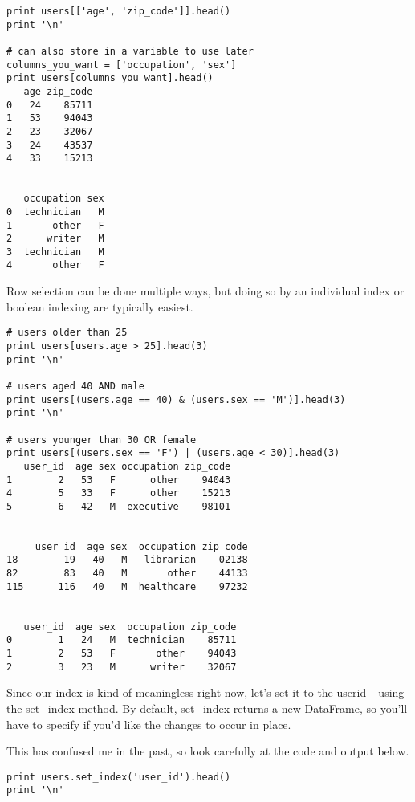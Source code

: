\begin{framed}
\begin{framed}
\begin{framed}
\begin{framed}
\begin{framed}
\begin{framed}
\begin{verbatim}
print users[['age', 'zip_code']].head()
print '\n'

# can also store in a variable to use later
columns_you_want = ['occupation', 'sex'] 
print users[columns_you_want].head()
   age zip_code
0   24    85711
1   53    94043
2   23    32067
3   24    43537
4   33    15213


   occupation sex
0  technician   M
1       other   F
2      writer   M
3  technician   M
4       other   F
\end{verbatim}


Row selection can be done multiple ways, but doing so by an individual index or boolean indexing are typically easiest.


\begin{framed}
\begin{verbatim}
# users older than 25
print users[users.age > 25].head(3)
print '\n'

# users aged 40 AND male
print users[(users.age == 40) & (users.sex == 'M')].head(3)
print '\n'

# users younger than 30 OR female
print users[(users.sex == 'F') | (users.age < 30)].head(3)
   user_id  age sex occupation zip_code
1        2   53   F      other    94043
4        5   33   F      other    15213
5        6   42   M  executive    98101


     user_id  age sex  occupation zip_code
18        19   40   M   librarian    02138
82        83   40   M       other    44133
115      116   40   M  healthcare    97232


   user_id  age sex  occupation zip_code
0        1   24   M  technician    85711
1        2   53   F       other    94043
2        3   23   M      writer    32067
\end{verbatim}

Since our index is kind of meaningless right now, let's set it to the userid\_ using the set\_index method. By default, set\_index returns a new DataFrame, so you'll have to specify if you'd like the changes to occur in place.

This has confused me in the past, so look carefully at the code and output below.


\begin{framed}
\begin{verbatim}
print users.set_index('user_id').head()
print '\n'


\end{verbatim}
\end{framed}
\end{framed}
\end{framed}
\end{framed}
\end{framed}
\end{framed}
\end{framed}
\end{framed}
